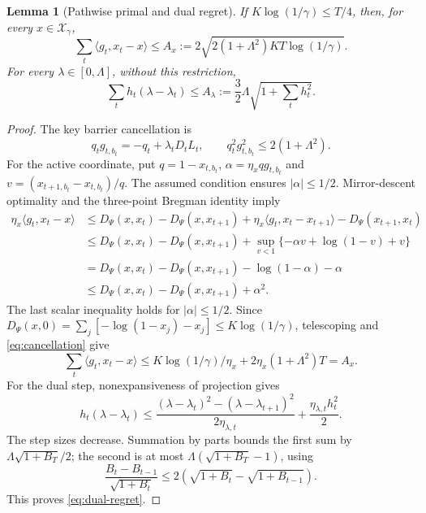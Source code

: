 \documentclass[11pt]{article}
\newtheorem{lemma}[theorem]{Lemma}
\theoremstyle{remark}
\begin{document}
\begin{lemma}[Pathwise primal and dual regret]
\label{lem:regret}
If $K\log(1/\gamma)\le T/4$, then, for every $x\in\mathcal X_\gamma$,
\begin{equation}
 \sum_t\langle g_t,x_t-x\rangle
 \le A_x:=2\sqrt{2(1+\Lambda^2)KT\log(1/\gamma)}.
 \label{eq:primal-regret}
\end{equation}
For every $\lambda\in[0,\Lambda]$, without this restriction,
\begin{equation}
 \sum_t h_t(\lambda-\lambda_t)
 \le A_\lambda:=\frac32\Lambda\sqrt{1+\sum_t h_t^2}.
 \label{eq:dual-regret}
\end{equation}
\end{lemma}
\begin{proof}
The key barrier cancellation is
\begin{equation}
 q_tg_{t,b_t}=-q_t+\lambda_tD_tL_t,\qquad
 q_t^2g_{t,b_t}^2\le2(1+\Lambda^2).
 \label{eq:cancellation}
\end{equation}
For the active coordinate, put $q=1-x_{t,b_t}$,
$\alpha=\eta_xqg_{t,b_t}$ and
$v=(x_{t+1,b_t}-x_{t,b_t})/q$. The assumed condition ensures
$|\alpha|\le1/2$. Mirror-descent optimality and the three-point
Bregman identity imply
\begin{align*}
 \eta_x\langle g_t,x_t-x\rangle
 &\le D_\Psi(x,x_t)-D_\Psi(x,x_{t+1})
       +\eta_x\langle g_t,x_t-x_{t+1}\rangle
       -D_\Psi(x_{t+1},x_t)\\
 &\le D_\Psi(x,x_t)-D_\Psi(x,x_{t+1})
       +\sup_{v<1}\{-\alpha v+\log(1-v)+v\}\\
 &=D_\Psi(x,x_t)-D_\Psi(x,x_{t+1})
       -\log(1-\alpha)-\alpha\\
 &\le D_\Psi(x,x_t)-D_\Psi(x,x_{t+1})+\alpha^2.
\end{align*}
The last scalar inequality holds for $|\alpha|\le1/2$.
Since $D_\Psi(x,0)=\sum_j[-\log(1-x_j)-x_j]\le K\log(1/\gamma)$,
telescoping and \eqref{eq:cancellation} give
\[
 \sum_t\langle g_t,x_t-x\rangle
 \le K\log(1/\gamma)/\eta_x+2\eta_x(1+\Lambda^2)T=A_x.
\]
For the dual step, nonexpansiveness of projection gives
\[
 h_t(\lambda-\lambda_t)
 \le\frac{(\lambda-\lambda_t)^2-(\lambda-\lambda_{t+1})^2}
              {2\eta_{\lambda,t}}
       +\frac{\eta_{\lambda,t}h_t^2}{2}.
\]
The step sizes decrease. Summation by parts bounds the first sum by
$\Lambda\sqrt{1+B_T}/2$; the second is at most
$\Lambda(\sqrt{1+B_T}-1)$, using
\[
 \frac{B_t-B_{t-1}}{\sqrt{1+B_t}}
 \le2(\sqrt{1+B_t}-\sqrt{1+B_{t-1}}).
\]
This proves \eqref{eq:dual-regret}.
\end{proof}
\end{document}
